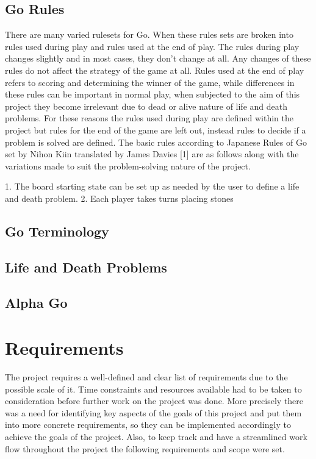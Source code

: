 \documentclass{l4proj}
\begin{document}
\section{Go Rules}

There are many varied rulesets for Go. When these rules sets are broken into rules used during play and rules used at the end of play. The rules during play changes slightly and in most cases, they don’t change at all. Any changes of these rules do not affect the strategy of the game at all. Rules used at the end of play refers to scoring and determining the winner of the game, while differences in these rules can be important in normal play, when subjected to the aim of this project they become irrelevant due to dead or alive nature of life and death problems. For these reasons the rules used during play are defined within the project but rules for the end of the game are left out, instead rules to decide if a problem is solved are defined. The basic rules according to Japanese Rules of Go set by Nihon Kiin translated by James Davies [1] are as follows along with the variations made to suit the problem-solving nature of the project.

1.	The board starting state can be set up as needed by the user to define a life and death problem.
2.	Each player takes turns placing stones


\section{Go Terminology}

\section{Life and Death Problems}

\section{Alpha Go}







\chapter{Requirements}


The project requires a well-defined and clear list of requirements due to the possible scale of it. Time constraints and resources available had to be taken to consideration before further work on the project was done. More precisely there was a need for identifying key aspects of the goals of this project and put them into more concrete requirements, so they can be implemented accordingly to achieve the goals of the project. Also, to keep track and have a streamlined work flow throughout the project the following requirements and scope were set.
\end{document}
